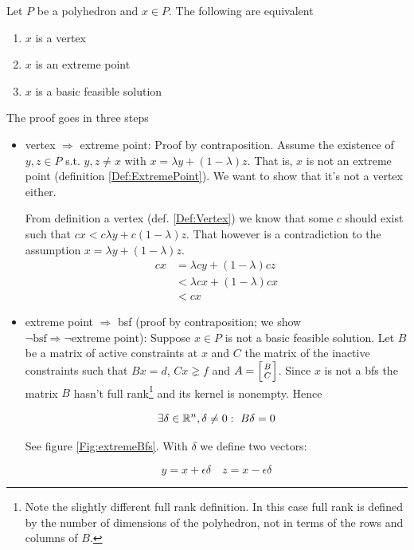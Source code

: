 \begin{thm} \label{Thm:cornerEquiv} Let $P$ be a polyhedron and $x\in P$. The following are equivalent
\begin{enumerate}
\item $x$ is a vertex
\item $x$ is an extreme point
\item $x$ is a basic feasible solution
\end{enumerate}
\end{thm}

\begin{pr} The proof goes in three steps
\begin{itemize}
\item vertex $\Rightarrow$ extreme point: Proof by contraposition. Assume the existence of $y,z \in P$ s.t. $y,z\neq x$ with $x= \lambda y + (1-\lambda )z$. That is, $x$ is not an extreme point (definition \ref{Def:ExtremePoint}). We want to show that it's not a vertex either.

From definition a vertex (def. \ref{Def:Vertex}) we know that some $c$ should exist such that $c x < c \lambda y  + c (1-\lambda) z$. That however is a contradiction to the assumption $x= \lambda y + (1-\lambda )z$.
\begin{align*}
cx &= \lambda cy +(1-\lambda)cz\\
   &< \lambda cx + (1-\lambda)cx\\
   &< cx
\end{align*}

\item extreme point $\Rightarrow$ bsf (proof by contraposition; we show $\neg \text{bsf} \Rightarrow \neg \text{extreme point}$): Suppose $x\in P$ is not a basic feasible solution. Let $B$ be a matrix of active constraints at $x$ and $C$ the matrix of the inactive constraints such that $Bx=d$, $Cx\gneq f$ and $A = \left[B\atop C\right]$. Since $x$ is not a bfs the matrix $B$ hasn't full rank\footnote{Note the slightly different full rank definition. In this case full rank is defined by the number of dimensions of the polyhedron, not in terms of the rows and columns of $B$.} and its kernel is nonempty. Hence

\[\exists \delta \in \R^n, \delta \neq 0:\ B\delta =0\]

See figure \ref{Fig:extremeBfs}. With $\delta$ we define two vectors:

\[y=x+\epsilon \delta \quad z = x-\epsilon \delta\]


\end{itemize}
\end{pr}
